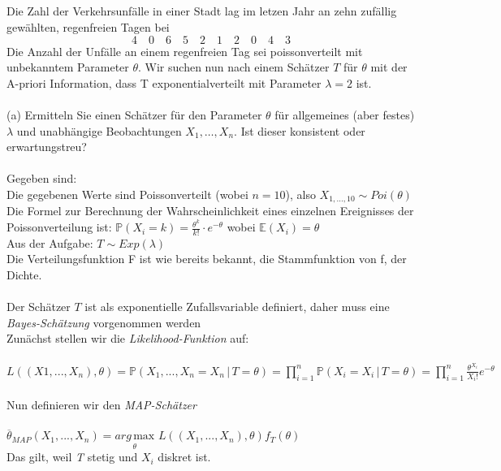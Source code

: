 \documentclass[a4paper]{article}
\begin{document}
\subsection{}
Die Zahl der Verkehrsunfälle in einer Stadt lag im letzen Jahr an zehn zufällig gewählten, regenfreien Tagen bei
\[4\quad 0\quad 6\quad 5\quad 2 \quad 1\quad 2\quad 0\quad 4\quad 3\]
Die Anzahl der Unfälle an einem regenfreien Tag sei poissonverteilt mit unbekanntem Parameter $\theta$. Wir suchen nun nach einem Schätzer $T$ für $\theta$ mit der A-priori  Information, dass T exponentialverteilt mit Parameter $\lambda = 2$ ist.\\\\
(a) Ermitteln Sie einen Schätzer für den Parameter $\theta$ für allgemeines (aber festes) $\lambda$ und unabhängige Beobachtungen $X_1,\dots, X_n$. Ist dieser konsistent oder erwartungstreu?\\\\
Gegeben sind:\\
Die gegebenen Werte sind Poissonverteilt (wobei $n = 10$), also $X_{1, ..., 10} \sim Poi(\theta)$\\
Die Formel zur Berechnung der Wahrscheinlichkeit eines einzelnen Ereignisses der Poissonverteilung ist: $\mathbb{P}(X_i = k) = \frac{\theta^k}{k!} \cdot e^{- \theta}$ wobei $\mathbb{E}(X_i) = \theta$\\
Aus der Aufgabe: $T \sim Exp(\lambda)$\\
Die Verteilungsfunktion F ist wie bereits bekannt, die Stammfunktion von f, der Dichte.\\\\
Der Schätzer $T$ ist als exponentielle Zufallsvariable definiert, daher muss eine \textit{Bayes-Schätzung} vorgenommen werden\\
Zunächst stellen wir die \textit{Likelihood-Funktion} auf:\\\\
$L((X1, ..., X_n), \theta) = \mathbb{P}(X_1, ..., X_n = X_n \,|\, T = \theta) = \prod\limits_{i = 1}^n \mathbb{P}(X_i = X_i \,|\, T = \theta) = \prod\limits_{i = 1}^n \frac{\theta^{X_i}}{X_i!}e^{- \theta}$\\\\
Nun definieren wir den \textit{MAP-Schätzer}\\\\
$\overline{\theta}_{MAP}(X_1, ..., X_n) = \underset{\theta}{arg\,\mathrm{max}}\,\, L((X_1, ..., X_n), \theta) f_T(\theta)$\\
Das gilt, weil \textit{T} stetig und $X_i$ diskret ist.\\\\
\end{document}
